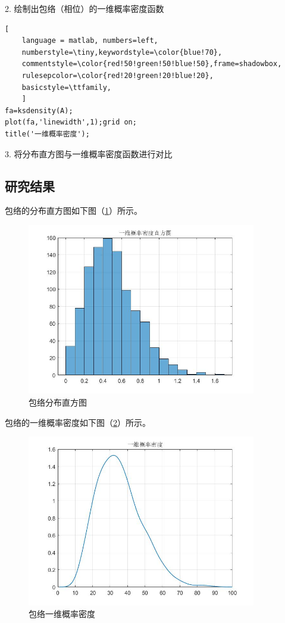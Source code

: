\documentclass[UTF-8, a4paper, 12pt]{ctexart}
\begin{document}
2. 绘制出包络（相位）的一维概率密度函数
\begin{lstlisting}[
	language = matlab, numbers=left, 
	numberstyle=\tiny,keywordstyle=\color{blue!70},
	commentstyle=\color{red!50!green!50!blue!50},frame=shadowbox,
	rulesepcolor=\color{red!20!green!20!blue!20},
	basicstyle=\ttfamily,
	]
fa=ksdensity(A);
plot(fa,'linewidth',1);grid on;
title('一维概率密度');
\end{lstlisting}

3. 将分布直方图与一维概率密度函数进行对比
\subsection{研究结果}
包络的分布直方图如下图（\ref{f82}）所示。
\begin{figure}[htbp]
    \centering
    \includegraphics[width=10cm]{figs/f82.jpg}
    \caption{包络分布直方图}
    \label{f82}
\end{figure}

包络的一维概率密度如下图（\ref{f81}）所示。
\begin{figure}[htbp]
    \centering
    \includegraphics[width=10cm]{figs/f81.jpg}
    \caption{包络一维概率密度}
    \label{f81}
\end{figure}
\end{document}
